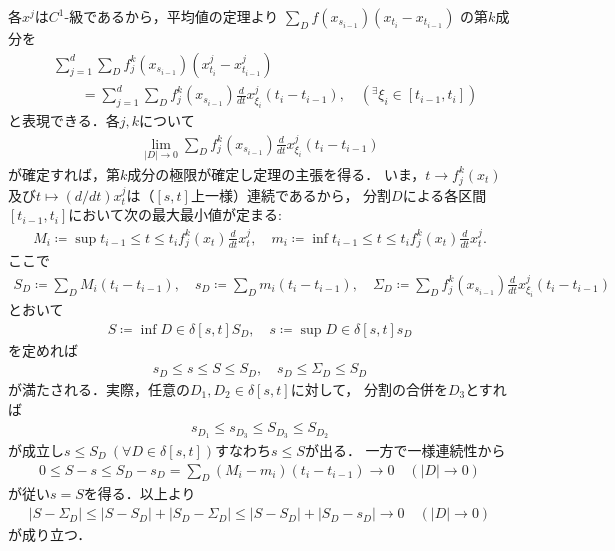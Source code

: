 	\begin{prf}
		各$x^j$は$C^1$-級であるから，平均値の定理より
		$\sum_{D} f(x_{s_{i-1}})(x_{t_i} - x_{t_{i-1}})$
		の第$k$成分を
		\begin{align}
			&\sum_{j=1}^{d} \sum_{D} f^k_j (x_{s_{i-1}})(x^j_{t_i} - x^j_{t_{i-1}}) 
				\label{eq:thm_existence_of_Riemann_Stieltjes_integral}\\
			&\qquad 
			= \sum_{j=1}^{d} \sum_{D} f^k_j (x_{s_{i-1}}) \tfrac{d}{dt}x^j_{\xi_i}(t_i - t_{i-1}),
			\quad ({}^\exists \xi_i \in [t_{i-1},t_i])
		\end{align}
		と表現できる．各$j,k$について
		\begin{align}
			\lim_{|D| \to 0} \sum_{D} f^k_j (x_{s_{i-1}}) \tfrac{d}{dt}x^j_{\xi_i}(t_i - t_{i-1})
		\end{align}
		が確定すれば，第$k$成分の極限が確定し定理の主張を得る．
		いま，$t \longrightarrow f^k_j(x_t)$及び$t \longmapsto (d/dt)x^j_t$は（$[s,t]$上一様）連続であるから，
		分割$D$による各区間$[t_{i-1},t_i]$において次の最大最小値が定まる:
		\begin{align}
			M_i \coloneqq \sup{t_{i-1} \leq t \leq t_i} f^k_j(x_t)\tfrac{d}{dt}x^j_t,
			\quad m_i \coloneqq \inf{t_{i-1} \leq t \leq t_i} f^k_j(x_t)\tfrac{d}{dt}x^j_t.
		\end{align}
		ここで
		\begin{align}
			S_D \coloneqq \sum_{D} M_i(t_i - t_{i-1}),
			\quad s_D \coloneqq \sum_{D} m_i(t_i - t_{i-1}),
			\quad \Sigma_D \coloneqq \sum_{D} f^k_j (x_{s_{i-1}}) \tfrac{d}{dt}x^j_{\xi_i}(t_i - t_{i-1})
		\end{align}
		とおいて
		\begin{align}
			S \coloneqq \inf{D \in \delta[s,t]}{S_D},
			\quad s \coloneqq \sup{D \in \delta[s,t]}{s_D}
		\end{align}
		を定めれば
		\begin{align}
			s_D \leq s \leq S \leq S_D,
			\quad s_D \leq \Sigma_D \leq S_D
		\end{align}
		が満たされる．実際，任意の$D_1,D_2 \in \delta[s,t]$に対して，
		分割の合併を$D_3$とすれば
		\begin{align}
			s_{D_1} \leq s_{D_3} \leq S_{D_3} \leq S_{D_2}
		\end{align}
		が成立し$s \leq S_D\ (\forall D \in \delta[s,t])$すなわち$s \leq S$が出る．
		一方で一様連続性から
		\begin{align}
			0 \leq S - s \leq S_D - s_D = \sum_D (M_i - m_i)(t_i - t_{i-1})
			\longrightarrow 0
			\quad (|D| \longrightarrow 0)
		\end{align}
		が従い$s = S$を得る．以上より
		\begin{align}
			|S - \Sigma_D| \leq |S - S_D| + |S_D - \Sigma_D|
			\leq |S - S_D| + |S_D - s_D|
			\longrightarrow 0
			\quad (|D| \longrightarrow 0)
		\end{align}
		が成り立つ．
		\QED
\end{prf}


